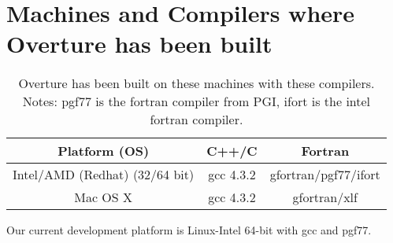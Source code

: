 
\section{Machines and Compilers where Overture has been built}

\begin{table}[hbt]
\begin{center}
\begin{tabular}{|c|c|c|}                   \hline
 Platform (OS)                & C++/C           & Fortran \\ \hline
 Intel/AMD (Redhat) (32/64 bit)   & gcc 4.3.2    & gfortran/pgf77/ifort \\
 Mac OS X                     & gcc 4.3.2       & gfortran/xlf  \\
 \hline
\end{tabular}
\caption{Overture has been built on these machines with these compilers.
  Notes: pgf77 is the fortran compiler from PGI, ifort is the intel fortran compiler.}
\end{center}
\end{table}


Our current development platform is Linux-Intel 64-bit with gcc and pgf77.

